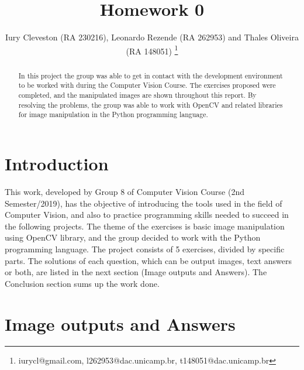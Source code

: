 \documentclass[]{IEEEtran}
\begin{document}
  \title{Homework 0}
  \author{Iury Cleveston (RA 230216), Leonardo Rezende (RA 262953) and Thales Oliveira (RA 148051)
    \thanks{iurycl@gmail.com, l262953@dac.unicamp.br, t148051@dac.unicamp.br}
  }

  \maketitle
  
  \begin{abstract}
    In this project the group was able to get in contact with the development environment to be worked with during the Computer Vision Course. The exercises proposed were completed, and the manipulated images are shown throughout this report. By resolving the problems, the group was able to work with OpenCV and related libraries for image manipulation in the Python programming language.
  \end{abstract}
  
  \section{Introduction}
  
  This work, developed by Group 8 of Computer Vision Course (2nd Semester/2019), has the objective of introducing the tools used in the field of Computer Vision, and also to practice programming skills needed to succeed in the following projects. The theme of the exercises is basic image manipulation using OpenCV library, and the group decided to work with the Python programming language. The project consists of 5 exercises, divided by specific parts. The solutions of each question, which can be output images, text answers or both, are listed in the next section (Image outputs and Answers). The Conclusion section sums up the work done. 


  \section{Image outputs and Answers}
\end{document}
